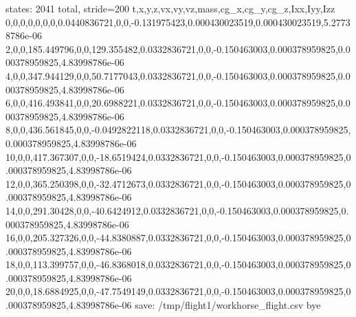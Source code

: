 \begin{console}
\ok states: 2041 total, stride=200
t,x,y,z,vx,vy,vz,mass,cg_x,cg_y,cg_z,Ixx,Iyy,Izz
0,0,0,0,0,0,0,0.0440836721,0,0,-0.131975423,0.000430023519,0.000430023519,5.27738786e-06
2,0,0,185.449796,0,0,129.355482,0.0332836721,0,0,-0.150463003,0.000378959825,0.000378959825,4.83998786e-06
4,0,0,347.944129,0,0,50.7177043,0.0332836721,0,0,-0.150463003,0.000378959825,0.000378959825,4.83998786e-06
6,0,0,416.493841,0,0,20.6988221,0.0332836721,0,0,-0.150463003,0.000378959825,0.000378959825,4.83998786e-06
8,0,0,436.561845,0,0,-0.0492822118,0.0332836721,0,0,-0.150463003,0.000378959825,0.000378959825,4.83998786e-06
10,0,0,417.367307,0,0,-18.6519424,0.0332836721,0,0,-0.150463003,0.000378959825,0.000378959825,4.83998786e-06
12,0,0,365.250398,0,0,-32.4712673,0.0332836721,0,0,-0.150463003,0.000378959825,0.000378959825,4.83998786e-06
14,0,0,291.30428,0,0,-40.6424912,0.0332836721,0,0,-0.150463003,0.000378959825,0.000378959825,4.83998786e-06
16,0,0,205.327326,0,0,-44.8380887,0.0332836721,0,0,-0.150463003,0.000378959825,0.000378959825,4.83998786e-06
18,0,0,113.399757,0,0,-46.8368018,0.0332836721,0,0,-0.150463003,0.000378959825,0.000378959825,4.83998786e-06
20,0,0,18.6884925,0,0,-47.7549149,0.0332836721,0,0,-0.150463003,0.000378959825,0.000378959825,4.83998786e-06
\ok save: /tmp/flight1/workhorse_flight.csv
\ok bye
\end{console}
